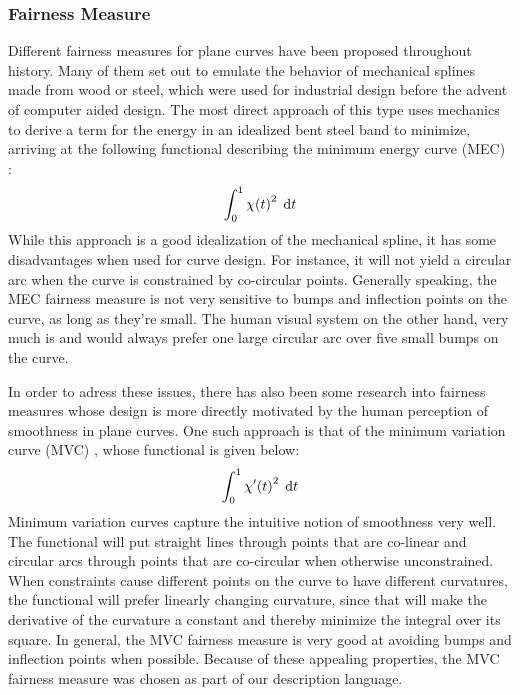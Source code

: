 \documentclass[a4paper]{article}
\begin{document}
			\subsubsection{Fairness Measure}
			\label{section:fairness_measure}

				Different fairness measures for plane curves have been proposed throughout history. Many of them set out to emulate the behavior of mechanical splines made from wood or steel, which were used for industrial design before the advent of computer aided design. The most direct approach of this type uses mechanics to derive a term for the energy in an idealized bent steel band to minimize, arriving at the following functional describing the minimum energy curve (MEC) \cite{paper-mec}:
				\begin{equation*}
					\int_{0}^{1} \chi\!\left( t \right)^2 \; \mathrm{d}t
				\end{equation*}
				While this approach is a good idealization of the mechanical spline, it has some disadvantages when used for curve design. For instance, it will not yield a circular arc when the curve is constrained by co-circular points. Generally speaking, the MEC fairness measure is not very sensitive to bumps and inflection points on the curve, as long as they're small. The human visual system on the other hand, very much is and would always prefer one large circular arc over five small bumps on the curve.

				In order to adress these issues, there has also been some research into fairness measures whose design is more directly motivated by the human perception of smoothness in plane curves. One such approach is that of the minimum variation curve (MVC) \cite{thesis-mvc}, whose functional is given below:
				\begin{equation*}
					\int_{0}^{1} \chi'\!\left( t \right)^2 \; \mathrm{d}t
				\end{equation*}
				Minimum variation curves capture the intuitive notion of smoothness very well. The functional will put straight lines through points that are co-linear and circular arcs through points that are co-circular when otherwise unconstrained. When constraints cause different points on the curve to have different curvatures, the functional will prefer linearly changing curvature, since that will make the derivative of the curvature a constant and thereby minimize the integral over its square. In general, the MVC fairness measure is very good at avoiding bumps and inflection points when possible. Because of these appealing properties, the MVC fairness measure was chosen as part of our description language.
\end{document}
